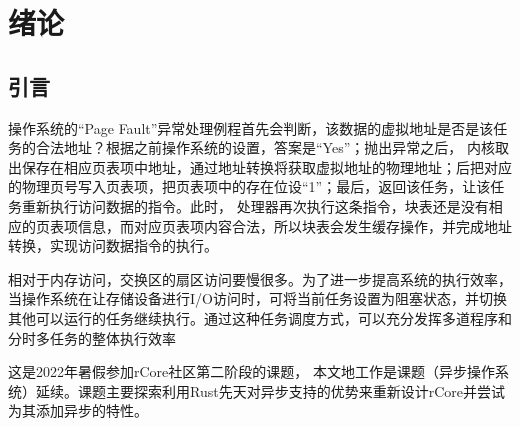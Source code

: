 \chapter{绪论}
\label{chap:references}

\section{引言}

操作系统的“Page Fault”异常处理例程首先会判断，该数据的虚拟地址是否是该任务的合法地址？根据之前操作系统的设置，答案是“Yes”；抛出异常之后， 内核取出保存在相应页表项中地址，通过地址转换将获取虚拟地址的物理地址；后把对应的物理页号写入页表项，把页表项中的存在位设“1”；最后，返回该任务，让该任务重新执行访问数据的指令。此时， 处理器再次执行这条指令，块表还是没有相应的页表项信息，而对应页表项内容合法，所以块表会发生缓存操作，并完成地址转换，实现访问数据指令的执行。

相对于内存访问，交换区的扇区访问要慢很多。为了进一步提高系统的执行效率，当操作系统在让存储设备进行I/O访问时，可将当前任务设置为阻塞状态，并切换其他可以运行的任务继续执行。通过这种任务调度方式，可以充分发挥多道程序和分时多任务的整体执行效率

这是2022年暑假参加rCore社区第二阶段的课题， 本文地工作是课题（异步操作系统）延续。课题主要探索利用Rust先天对异步支持的优势来重新设计rCore并尝试为其添加异步的特性。

